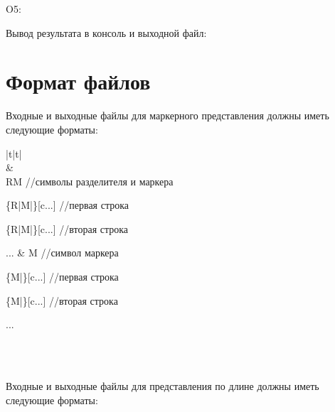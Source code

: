 \documentclass[12pt,a4paper]{extarticle}
\begin{document}
O5: {\ttfamily\footnotesize Вывод результата в консоль и выходной файл:\par
[формат выходного файла]}

\section{Формат файлов}
Входные и выходные файлы для маркерного представления должны иметь следующие форматы:
\newpage

\begin{xltabular}{\textwidth}{|t|t|}
    \hline
     \\ \hline
     &  \\ \hline
    RM \normalfont //символы разделителя и маркера\par\ttfamily
    [c...]\{R|M|\}[c...] \normalfont //первая строка\par\ttfamily
    [c...]\{R|M|\}[c...] \normalfont //вторая строка\par\ttfamily
    ... &
    M \normalfont //символ маркера\par\ttfamily
    [c...]\{M|\}[c...] \normalfont //первая строка\par\ttfamily
    [c...]\{M|\}[c...] \normalfont //вторая строка\par\ttfamily
    ... \\ \hline

     \\ \hline
     \\ \hline
\end{xltabular}

Входные и выходные файлы для представления по длине должны иметь следующие форматы:
\end{document}
